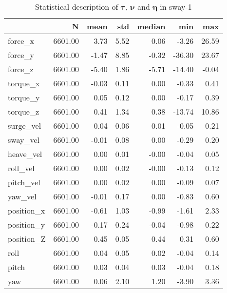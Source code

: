\begin{table}[hb]
\centering
\caption{Statistical description of $\boldsymbol{\tau}$, $\boldsymbol{\nu}$ and $\boldsymbol{\eta}$ in sway-1}
\label{tab:description-sway-1}
\begin{tabular}{lrrrrrr}
\toprule
{} &       N &  mean &  std & median &    min &   max \\
\midrule
force\_x    & 6601.00 &  3.73 & 5.52 &   0.06 &  -3.26 & 26.59 \\
force\_y    & 6601.00 & -1.47 & 8.85 &  -0.32 & -36.30 & 23.67 \\
force\_z    & 6601.00 & -5.40 & 1.86 &  -5.71 & -14.40 & -0.04 \\
torque\_x   & 6601.00 & -0.03 & 0.11 &   0.00 &  -0.33 &  0.41 \\
torque\_y   & 6601.00 &  0.05 & 0.12 &   0.00 &  -0.17 &  0.39 \\
torque\_z   & 6601.00 &  0.41 & 1.34 &   0.38 & -13.74 & 10.86 \\
surge\_vel  & 6601.00 &  0.04 & 0.06 &   0.01 &  -0.05 &  0.21 \\
sway\_vel   & 6601.00 & -0.01 & 0.08 &   0.00 &  -0.29 &  0.20 \\
heave\_vel  & 6601.00 &  0.00 & 0.01 &  -0.00 &  -0.04 &  0.05 \\
roll\_vel   & 6601.00 &  0.00 & 0.02 &  -0.00 &  -0.13 &  0.12 \\
pitch\_vel  & 6601.00 &  0.00 & 0.02 &   0.00 &  -0.09 &  0.07 \\
yaw\_vel    & 6601.00 & -0.01 & 0.17 &   0.00 &  -0.83 &  0.60 \\
position\_x & 6601.00 & -0.61 & 1.03 &  -0.99 &  -1.61 &  2.33 \\
position\_y & 6601.00 & -0.17 & 0.24 &  -0.04 &  -0.98 &  0.22 \\
position\_Z & 6601.00 &  0.45 & 0.05 &   0.44 &   0.31 &  0.60 \\
roll       & 6601.00 &  0.04 & 0.05 &   0.02 &  -0.04 &  0.14 \\
pitch      & 6601.00 &  0.03 & 0.04 &   0.03 &  -0.04 &  0.18 \\
yaw        & 6601.00 &  0.06 & 2.10 &   1.20 &  -3.90 &  3.36 \\
\bottomrule
\end{tabular}
\end{table}
